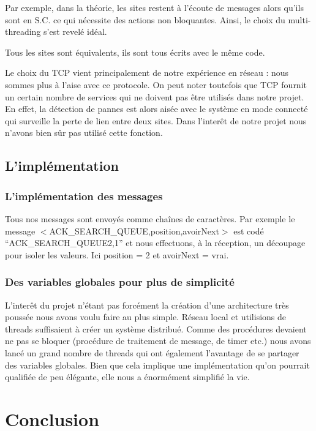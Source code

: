 \documentclass[a4paper,12pt]{report}
\begin{document}
Par exemple, dans la théorie, les sites restent à l'écoute de messages alors qu'ils sont en S.C. ce qui nécessite des actions non bloquantes. Ainsi, le choix du multi-threading s'est revelé idéal.

Tous les sites sont équivalents, ils sont tous écrits avec le même code.

Le choix du TCP vient principalement de notre expérience en réseau : nous sommes plus à l'aise avec ce protocole. 
On peut noter toutefois que TCP fournit un certain nombre de services qui ne doivent pas être utilisés dans notre projet. En effet, la détection de pannes est alors aisée avec le système en mode connecté qui surveille la perte de lien entre deux sites. Dans l'interêt de notre projet nous n'avons bien sûr pas utilisé cette fonction.

\subsection*{L'implémentation}

\subsubsection*{L'implémentation des messages}
Tous nos messages sont envoyés comme chaînes de caractères.
Par exemple le message $<$ACK\_SEARCH\_QUEUE,position,avoirNext$>$ est codé ``ACK\_SEARCH\_QUEUE2,1'' et nous effectuons, à la réception, un découpage pour isoler les valeurs. Ici position = 2 et avoirNext = vrai.

\subsubsection*{Des variables globales pour plus de simplicité}
L'interêt du projet n'étant pas forcément la création d'une architecture très poussée nous avons voulu faire au plus simple. Réseau local et utilisions de threads suffisaient à créer un système distribué.
Comme des procédures devaient ne pas se bloquer (procédure de traitement de message, de timer etc.) nous avons lancé un grand nombre de threads qui ont également l'avantage de se partager des variables globales. Bien que cela implique une implémentation qu'on pourrait qualifiée de peu élégante, elle nous a énormément simplifié la vie.

\newpage

\section{Conclusion}
\end{document}
